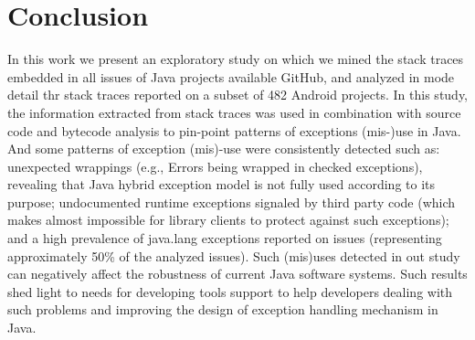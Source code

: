 \documentclass[conference]{IEEEtran}
\begin{document}

\section{Conclusion}

In this work we present an exploratory study on which we mined the stack 
traces embedded in all issues of Java projects available GitHub, and analyzed in mode detail thr
stack traces reported on a subset of 482 Android projects. In this study, the information extracted 
from stack traces was used in combination with source code and bytecode analysis to 
pin-point patterns of exceptions (mis-)use in Java. And some patterns of exception
(mis)-use were consistently detected such as: unexpected wrappings (e.g., Errors
being wrapped in checked exceptions), revealing that Java hybrid exception
model is not fully used according to its purpose; undocumented runtime
exceptions signaled by third party code (which makes almost impossible for
library clients to protect against such exceptions); and a high prevalence of
java.lang exceptions reported on issues (representing approximately 50\% of the
analyzed issues). Such (mis)uses detected in out study can negatively affect the 
robustness of current Java software systems. Such results shed light to needs for  
 developing tools support to help developers dealing with such problems and 
improving the design of exception handling mechanism in Java.
\end{document}
